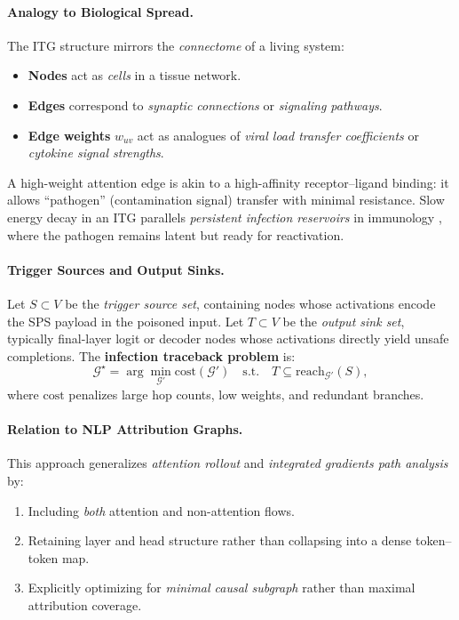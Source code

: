 \documentclass[11pt]{article}
\begin{document}
\paragraph{Analogy to Biological Spread.}
The ITG structure mirrors the \textit{connectome} of a living system:
\begin{itemize}
    \item \textbf{Nodes} act as \emph{cells} in a tissue network.
    \item \textbf{Edges} correspond to \emph{synaptic connections} or \emph{signaling pathways}.
    \item \textbf{Edge weights} $w_{uv}$ act as analogues of \emph{viral load transfer coefficients} or \emph{cytokine signal strengths}.
\end{itemize}
A high-weight attention edge is akin to a high-affinity receptor–ligand binding: it allows “pathogen” (contamination signal) transfer with minimal resistance.  
Slow energy decay in an ITG parallels \emph{persistent infection reservoirs} in immunology \citep{perelson1996hiv, nowak2000virus}, where the pathogen remains latent but ready for reactivation.

\paragraph{Trigger Sources and Output Sinks.}
Let $S \subset V$ be the \textit{trigger source set}, containing nodes whose activations encode the SPS payload in the poisoned input.  
Let $T \subset V$ be the \textit{output sink set}, typically final-layer logit or decoder nodes whose activations directly yield unsafe completions.  
The \textbf{infection traceback problem} is:
\[
\mathcal{G}^\star = \arg\min_{\mathcal{G}'} \mathrm{cost}(\mathcal{G}') \quad \text{s.t.} \quad T \subseteq \mathrm{reach}_{\mathcal{G}'}(S),
\]
where $\mathrm{cost}$ penalizes large hop counts, low weights, and redundant branches.

\paragraph{Relation to NLP Attribution Graphs.}
This approach generalizes \emph{attention rollout} \citep{abnar2020quantifying} and \emph{integrated gradients path analysis} \citep{sundararajan2017axiomatic} by:
\begin{enumerate}
    \item Including \emph{both} attention and non-attention flows.
    \item Retaining layer and head structure rather than collapsing into a dense token–token map.
    \item Explicitly optimizing for \emph{minimal causal subgraph} rather than maximal attribution coverage.
\end{enumerate}
\end{document}
